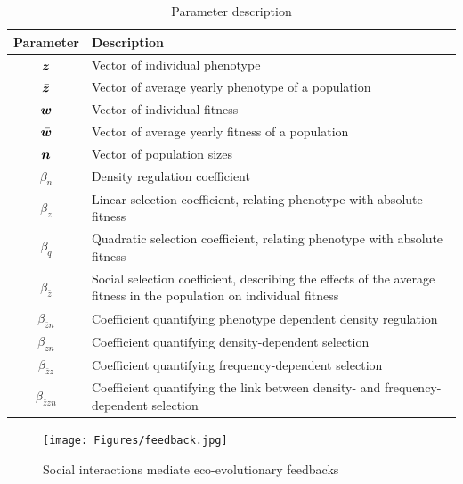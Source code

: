 \documentclass{article}
\begin{document}
\newpage
\begin{table}
	\begin{singlespace}
		\begin{tabular}{|c|p{12cm}|} 
			\hline
			
			Parameter & Description \\ 
			\hline
			$\vectorsym{z}$        & Vector of individual phenotype \\ 
			$\bar{\vectorsym{z}}$  & Vector of average yearly phenotype of a population\\ 
			$\vectorsym{w}$        & Vector of individual fitness \\ 
			$\bar{\vectorsym{w}}$  & Vector of average yearly fitness of a population\\ 
			$\vectorsym{n}$        & Vector of population sizes \\ 
			$\beta_n$              & Density regulation coefficient \\ 
			$\beta_z$              & Linear selection coefficient, relating phenotype with absolute fitness \\ 
			$\beta_q$              & Quadratic selection coefficient, relating phenotype with absolute fitness \\ 
			$\beta_{\bar{z}}$      & Social selection coefficient, describing the effects of the average fitness in the population on individual fitness \\ 
			$\beta_{\bar{z}n}$     & Coefficient quantifying phenotype dependent density regulation \\ 
			$\beta_{zn}$           & Coefficient quantifying density-dependent selection \\ 
			$\beta_{\bar{z}z}$     & Coefficient quantifying frequency-dependent selection \\ 
			$\beta_{\bar{z}zn}$    & Coefficient quantifying the link between density- and frequency-dependent selection\\ 
			\hline
		\end{tabular}
		\caption{Parameter description  }
	\end{singlespace}
\end{table}


  
\begin{figure}[ht]
	\centering
	\texttt{[image: Figures/feedback.jpg]}
	\caption{Social interactions mediate eco-evolutionary feedbacks}
\end{figure}
\end{document}
